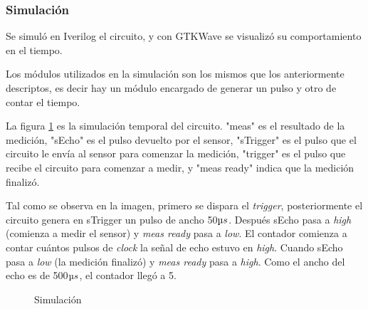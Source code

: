 \documentclass[../../e3_tp2_main.tex]{subfiles}
\begin{document}
\subsubsection{Simulación}
Se simul\'o en Iverilog el circuito, y con GTKWave se visualizó su comportamiento en el tiempo.
\par Los módulos utilizados en la simulación son los mismos que los anteriormente descriptos, es decir hay un módulo encargado de generar un pulso y otro de contar el tiempo.\par

La figura \ref{fig:simg} es la simulación temporal del circuito. "meas" es el resultado de la medición, "sEcho" es el pulso devuelto por el sensor, "sTrigger" es el pulso que el circuito le envía al sensor para comenzar la medición, "trigger" es el pulso que recibe el circuito para comenzar a medir, y "meas ready" indica que la medición finaliz\'o.
\par Tal como se observa en la imagen, primero se dispara el \textit{trigger}, posteriormente el circuito genera en sTrigger un pulso de ancho 50$\micro s$. Despu\'es sEcho pasa a \textit{high} (comienza a medir el sensor) y \textit{meas ready} pasa a \textit{low}. El contador comienza a contar cu\'antos pulsos de \textit{clock} la señal de echo estuvo en \textit{high}. Cuando sEcho pasa a \textit{low} (la medición finaliz\'o) y \textit{meas ready} pasa a \textit{high}. Como el ancho del echo es de 500$\micro s$, el contador llegó a 5.

\begin{figure}[b]	
	\centering
	\caption{Simulación}\label{fig:simg}
\end{figure}
\end{document}
